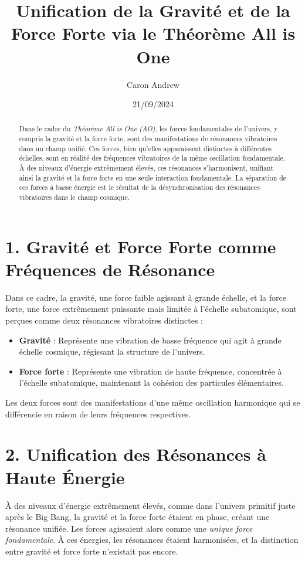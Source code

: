 \documentclass{article}
\title{Unification de la Gravité et de la Force Forte via le Théorème All is One}
\author{Caron Andrew}
\date{21/09/2024}
\begin{document}
\maketitle

\begin{abstract}
Dans le cadre du \textit{Théorème All is One (AO)}, les forces fondamentales de l'univers, y compris la gravité et la force forte, sont des manifestations de résonances vibratoires dans un champ unifié. Ces forces, bien qu'elles apparaissent distinctes à différentes échelles, sont en réalité des fréquences vibratoires de la même oscillation fondamentale. À des niveaux d'énergie extrêmement élevés, ces résonances s'harmonisent, unifiant ainsi la gravité et la force forte en une seule interaction fondamentale. La séparation de ces forces à basse énergie est le résultat de la désynchronisation des résonances vibratoires dans le champ cosmique.
\end{abstract}

\section{1. Gravité et Force Forte comme Fréquences de Résonance}

Dans ce cadre, la gravité, une force faible agissant à grande échelle, et la force forte, une force extrêmement puissante mais limitée à l'échelle subatomique, sont perçues comme deux résonances vibratoires distinctes :
\begin{itemize}
    \item \textbf{Gravité} : Représente une vibration de basse fréquence qui agit à grande échelle cosmique, régissant la structure de l'univers.
    \item \textbf{Force forte} : Représente une vibration de haute fréquence, concentrée à l'échelle subatomique, maintenant la cohésion des particules élémentaires.
\end{itemize}

Les deux forces sont des manifestations d'une même oscillation harmonique qui se différencie en raison de leurs fréquences respectives.

\section{2. Unification des Résonances à Haute Énergie}

À des niveaux d'énergie extrêmement élevés, comme dans l'univers primitif juste après le Big Bang, la gravité et la force forte étaient en phase, créant une résonance unifiée. Les forces agissaient alors comme une \textit{unique force fondamentale}. À ces énergies, les résonances étaient harmonisées, et la distinction entre gravité et force forte n'existait pas encore.
\end{document}
